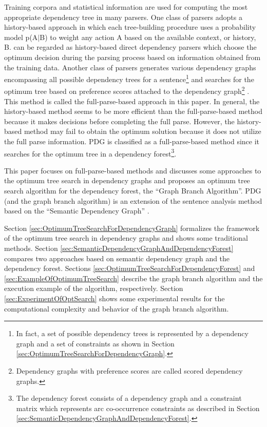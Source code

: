 Training corpora and statistical information are used for computing
the most appropriate dependency tree in many parsers. One class
of parsers adopts a history-based approach\cite{Black92} in which each
tree-building procedure uses a probability model p(A$\mid$B) to weight any
action A based on the available context, or history, B.
\cite{YamadaAndMatsumoto03,NivreAndScholz04} can be regarded as
history-based direct dependency parsers which choose the optimum
decision during the parsing process based on information obtained from
the training data. Another class of parsers generates various
dependency graphs encompassing all possible dependency trees for a
sentence\footnote{In fact, a set of possible dependency trees is
represented by a dependency graph and a set of constraints as shown in
Section \ref{sec:OptimumTreeSearchForDependencyGraph}.} and searches
for the optimum tree based on preference scores attached to the
dependency graph\footnote{Dependency graphs with preference scores are
called scored dependency graphs.}
\cite{Ozeki94,Kato_ehara89,Hirakawa01,McDonald05}. This method is
called the full-parse-based approach in this paper. In general, the
history-based method seems to be more efficient than the
full-parse-based method because it makes decisions before completing
the full parse. However, the history-based method may fail to obtain
the optimum solution because it does not utilize the full parse
information. PDG is classified as a full-parse-based method since it
searches for the optimum tree in a dependency forest\footnote{The
dependency forest consists of a dependency graph and a constraint
matrix which represents arc co-occurrence constraints as described in
Section \ref{sec:SemanticDependencyGraphAndDependencyForest}.}.

This paper focuses on full-parse-based methods and discusses some
approaches to the optimum tree search in dependency graphs and
proposes an optimum tree search algorithm for the dependency forest,
the ``Graph Branch Algorithm''. PDG (and the graph branch
algorithm) is an extension of the sentence analysis method based on the
``Semantic Dependency Graph'' \cite{Hirakawa89b_e,Hirakawa01}.

Section \ref{sec:OptimumTreeSearchForDependencyGraph} formalizes the
framework of the optimum tree search in dependency graphs and shows
some traditional methods. Section
\ref{sec:SemanticDependencyGraphAndDependencyForest} compares two
approaches based on semantic dependency graph and the dependency
forest. Sections \ref{sec:OptimumTreeSearchForDependencyForest} and
\ref{sec:ExampleOfOptimumTreeSearch} describe the graph branch
algorithm and the execution example of the algorithm,
respectively. Section \ref{sec:ExperimentOfOptSearch} shows some
experimental results for the computational complexity and behavior of the graph branch
algorithm.


